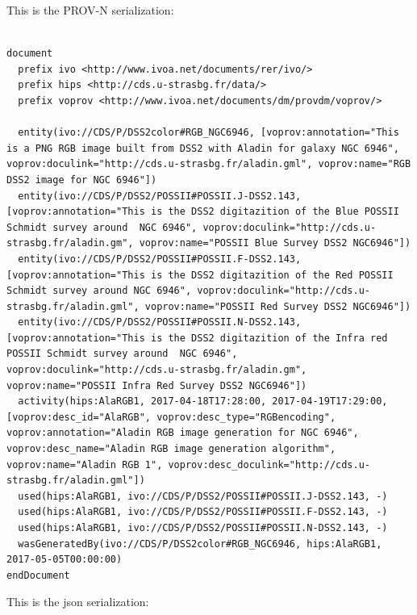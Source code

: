 This is the PROV-N serialization:

\begin{verbatim}

document
  prefix ivo <http://www.ivoa.net/documents/rer/ivo/>
  prefix hips <http://cds.u-strasbg.fr/data/>
  prefix voprov <http://www.ivoa.net/documents/dm/provdm/voprov/>

  entity(ivo://CDS/P/DSS2color#RGB_NGC6946, [voprov:annotation="This is a PNG RGB image built from DSS2 with Aladin for galaxy NGC 6946", voprov:doculink="http://cds.u-strasbg.fr/aladin.gml", voprov:name="RGB DSS2 image for NGC 6946"])
  entity(ivo://CDS/P/DSS2/POSSII#POSSII.J-DSS2.143, [voprov:annotation="This is the DSS2 digitazition of the Blue POSSII Schmidt survey around  NGC 6946", voprov:doculink="http://cds.u-strasbg.fr/aladin.gm", voprov:name="POSSII Blue Survey DSS2 NGC6946"])
  entity(ivo://CDS/P/DSS2/POSSII#POSSII.F-DSS2.143, [voprov:annotation="This is the DSS2 digitazition of the Red POSSII Schmidt survey around NGC 6946", voprov:doculink="http://cds.u-strasbg.fr/aladin.gml", voprov:name="POSSII Red Survey DSS2 NGC6946"])
  entity(ivo://CDS/P/DSS2/POSSII#POSSII.N-DSS2.143, [voprov:annotation="This is the DSS2 digitazition of the Infra red POSSII Schmidt survey around  NGC 6946", voprov:doculink="http://cds.u-strasbg.fr/aladin.gm", voprov:name="POSSII Infra Red Survey DSS2 NGC6946"])
  activity(hips:AlaRGB1, 2017-04-18T17:28:00, 2017-04-19T17:29:00, [voprov:desc_id="AlaRGB", voprov:desc_type="RGBencoding", voprov:annotation="Aladin RGB image generation for NGC 6946", voprov:desc_name="Aladin RGB image generation algorithm", voprov:name="Aladin RGB 1", voprov:desc_doculink="http://cds.u-strasbg.fr/aladin.gml"])
  used(hips:AlaRGB1, ivo://CDS/P/DSS2/POSSII#POSSII.J-DSS2.143, -)
  used(hips:AlaRGB1, ivo://CDS/P/DSS2/POSSII#POSSII.F-DSS2.143, -)
  used(hips:AlaRGB1, ivo://CDS/P/DSS2/POSSII#POSSII.N-DSS2.143, -)
  wasGeneratedBy(ivo://CDS/P/DSS2color#RGB_NGC6946, hips:AlaRGB1, 2017-05-05T00:00:00)
endDocument

\end{verbatim}

This is the json serialization:

